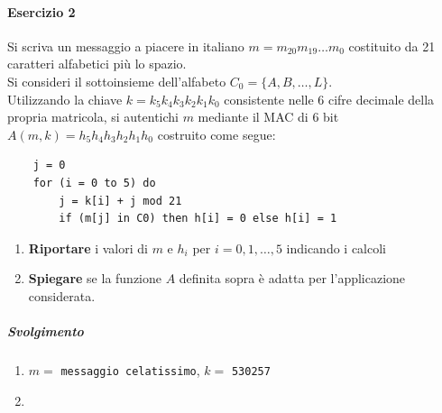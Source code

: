\documentclass[10pt]{book}
\begin{document}
\paragraph{Esercizio 2} Si scriva un messaggio a piacere in italiano $m = m_{20}m_{19}\ldots m_0$ costituito da 21 caratteri alfabetici più lo spazio.\\
Si consideri il sottoinsieme dell'alfabeto $C_0 = \{A,B,\ldots,L\}$.\\
Utilizzando la chiave $k = k_5k_4k_3k_2k_1k_0$ consistente nelle 6 cifre decimale della propria matricola, si autentichi $m$ mediante il MAC di 6 bit $A(m,k) = h_5h_4h_3h_2h_1h_0$ costruito come segue:
\begin{lstlisting}
	j = 0
	for (i = 0 to 5) do
		j = k[i] + j mod 21
		if (m[j] in C0) then h[i] = 0 else h[i] = 1
\end{lstlisting}
\begin{enumerate}
	\item \textbf{Riportare} i valori di $m$ e $h_i$ per $i = 0,1,\ldots,5$ indicando i calcoli
	\item \textbf{Spiegare} se la funzione $A$ definita sopra è adatta per l'applicazione considerata.
\end{enumerate}
\subparagraph{Svolgimento} \begin{enumerate}
\item $m =$ \texttt{messaggio celatissimo}, $k =$ \texttt{530257}
\item
\end{enumerate}
\pagebreak
\end{document}

